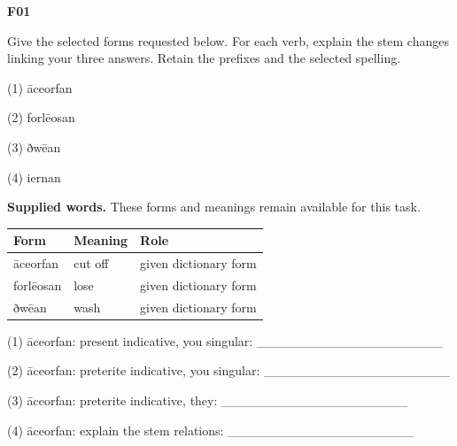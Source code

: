 \par\begin{minipage}{\linewidth}\raggedright
\textbf{F01}

Give the selected forms requested below. For each verb, explain the stem changes linking your three answers. Retain the prefixes and the selected spelling.

(1) āceorfan

(2) forlēosan

(3) ðwēan

(4) iernan

\textbf{Supplied words.} These forms and meanings remain available for this task.

\par\begingroup
\fontsize{10.5}{13.2}\selectfont
\setlength{\LTleft}{0pt}\setlength{\LTright}{\fill}
\noindent
\begin{tabular}{@{}>{\raggedright\arraybackslash}p{33.87mm}>{\raggedright\arraybackslash}p{33.87mm}>{\raggedright\arraybackslash}p{50.64mm}@{}}
\toprule
\textbf{Form} & \textbf{Meaning} & \textbf{Role} \\
\midrule
āceorfan & cut off & given dictionary form \\
forlēosan & lose & given dictionary form \\
ðwēan & wash & given dictionary form \\
\bottomrule
\end{tabular}
\par\endgroup

(1) āceorfan: present indicative, you singular: \_\_\_\_\_\_\_\_\_\_\_\_\_\_\_\_\_\_\_\_

(2) āceorfan: preterite indicative, you singular: \_\_\_\_\_\_\_\_\_\_\_\_\_\_\_\_\_\_\_\_

(3) āceorfan: preterite indicative, they: \_\_\_\_\_\_\_\_\_\_\_\_\_\_\_\_\_\_\_\_

(4) āceorfan: explain the stem relations: \_\_\_\_\_\_\_\_\_\_\_\_\_\_\_\_\_\_\_\_


\end{minipage}
